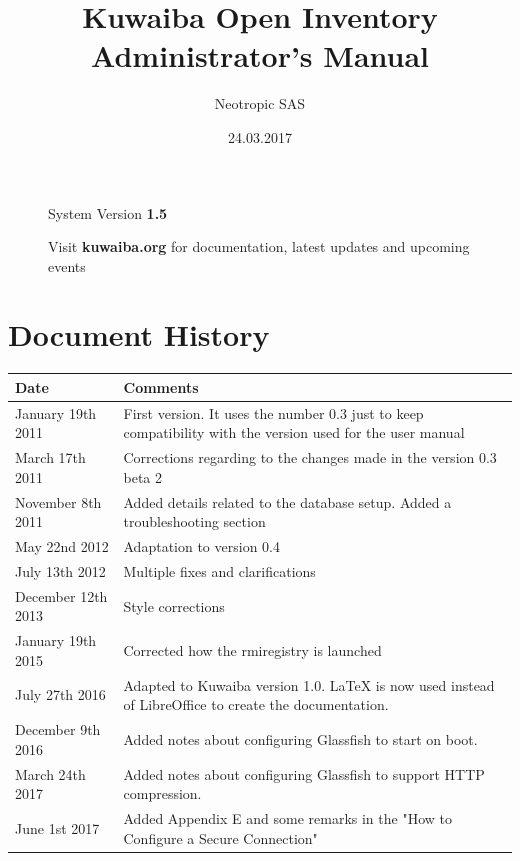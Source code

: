 \documentclass[a4paper]{article}
\title{Kuwaiba Open Inventory Administrator's Manual}
\author{Neotropic SAS}
\date{24.03.2017}
\begin{document}
	\maketitle
	
	
	
	\begin{figure}[b]
		\centering System Version \textbf{1.5}
			
		Visit \textbf{kuwaiba.org} for documentation, latest updates and upcoming events
	\end{figure}
	
	
	\newpage
	
	\tableofcontents

	\newpage
	\section{Document History}
		\begin{table}[h!]
			\centering
			\begin{tabular}{l||p{10cm}} %
				\toprule
				\textbf{Date} & \textbf{Comments}  \\
				\midrule
				January 19th 2011 & First version. It uses the number 0.3 just to keep compatibility with the version used for the user manual\\
				\midrule
				March 17th 2011 & Corrections regarding to the changes made in the version 0.3 beta 2 \\
				\midrule
				November 8th 2011 & Added details related to the database setup. Added a troubleshooting section \\
				\midrule
				May 22nd 2012 & Adaptation to version 0.4 \\
				\midrule
				July 13th 2012 & Multiple fixes and clarifications \\
				\midrule
				December 12th 2013 & Style corrections \\
				\midrule
				January 19th 2015 & Corrected how the rmiregistry is launched \\
				\midrule
				July 27th 2016 & Adapted to Kuwaiba version 1.0. LaTeX is now used instead of LibreOffice to create the documentation. \\
				\midrule
				December 9th 2016 & Added notes about configuring Glassfish to start on boot. \\
				\midrule
				March 24th 2017 & Added notes about configuring Glassfish to support HTTP compression. \\
				\midrule
				June 1st 2017 & Added Appendix E and some remarks in the "How to Configure a Secure Connection"\\
				\bottomrule
			\end{tabular}	
				
		\end{table}
	\newpage
\end{document}
